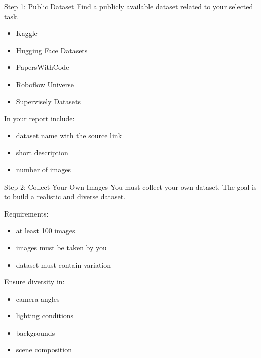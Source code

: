 \documentclass[aspectratio=169]{beamer}
\begin{document}
\begin{frame}[t]{Step 1: Public Dataset}
\vspace*{-0.5cm}
Find a publicly available dataset related to your selected task.

\begin{itemize}
\item Kaggle
\item Hugging Face Datasets
\item PapersWithCode
\item Roboflow Universe
\item Supervisely Datasets
\end{itemize}

In your report include:

\begin{itemize}
\item dataset name with the source link
\item short description
\item number of images
\end{itemize}

\end{frame}

\begin{frame}[t]{Step 2: Collect Your Own Images}
\vspace*{-0.5cm}
You must collect your own dataset. The goal is to build a realistic and diverse dataset.

Requirements:

\begin{itemize}
\item at least 100 images
\item images must be taken by you
\item dataset must contain variation
\end{itemize}

Ensure diversity in:

\begin{itemize}
\item camera angles
\item lighting conditions
\item backgrounds
\item scene composition
\end{itemize}



\end{frame}
\end{document}
